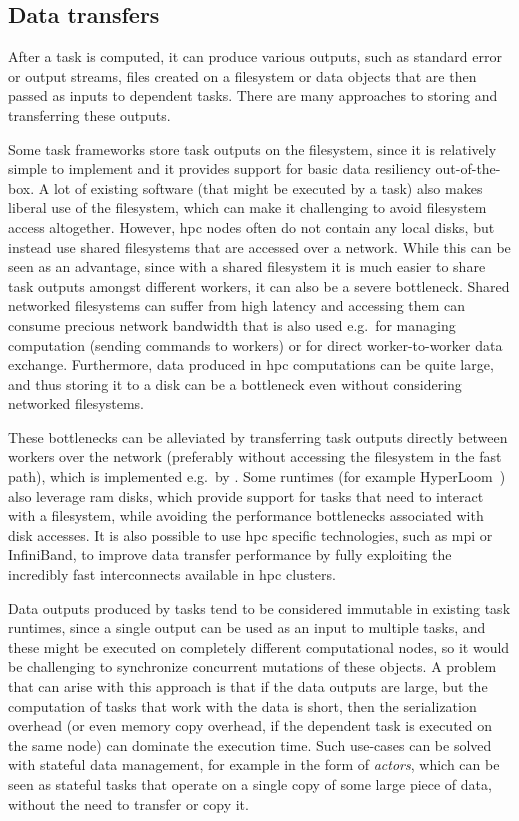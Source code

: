 \subsection{Data transfers}
After a task is computed, it can produce various outputs, such as standard error or output streams,
files created on a filesystem or data objects that are then passed as inputs to dependent tasks.
There are many approaches to storing and transferring these outputs.

Some task frameworks store task outputs on the filesystem, since it is relatively simple to
implement and it provides support for basic data resiliency out-of-the-box. A lot of existing
software (that might be executed by a task) also makes liberal use of the filesystem, which can
make it challenging to avoid filesystem access altogether. However, \gls{hpc}
nodes often do not contain any local disks, but instead use shared filesystems that are accessed
over a network. While this can be seen as an advantage, since with a shared filesystem it is much
easier to share task outputs amongst different workers, it can also be a severe bottleneck. Shared
networked filesystems can suffer from high latency and accessing them can consume precious network
bandwidth that is also used e.g.\ for managing computation (sending commands to workers) or for
direct worker-to-worker data exchange. Furthermore, data produced in \gls{hpc}
computations can be quite large, and thus storing it to a disk can be a bottleneck even without
considering networked filesystems.

These bottlenecks can be alleviated by transferring task outputs directly between workers over the
network (preferably without accessing the filesystem in the fast path), which is implemented e.g.\
by \dask{}. Some runtimes (for example HyperLoom~\cite{hyperloom})
also leverage \gls{ram} disks, which provide support for tasks that need to
interact with a filesystem, while avoiding the performance bottlenecks associated with disk
accesses. It is also possible to use \gls{hpc} specific technologies, such as
\gls{mpi} or InfiniBand, to improve data transfer performance by fully exploiting
the incredibly fast interconnects available in \gls{hpc} clusters.

Data outputs produced by tasks tend to be considered immutable in existing task runtimes, since a
single output can be used as an input to multiple tasks, and these might be executed on completely
different computational nodes, so it would be challenging to synchronize concurrent mutations of
these objects. A problem that can arise with this approach is that if the data outputs are large,
but the computation of tasks that work with the data is short, then the serialization overhead (or
even memory copy overhead, if the dependent task is executed on the same node) can dominate the
execution time. Such use-cases can be solved with stateful data management, for example in the form
of \emph{actors}, which can be seen as stateful tasks that operate on a single copy
of some large piece of data, without the need to transfer or copy it.

